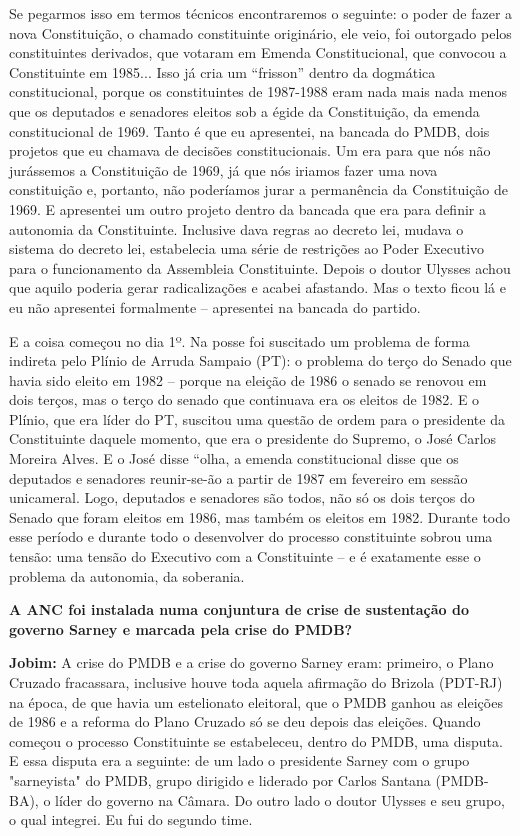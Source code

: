 Se pegarmos isso em termos técnicos encontraremos o seguinte: o poder de
fazer a nova Constituição, o chamado constituinte originário, ele veio,
foi outorgado pelos constituintes derivados, que votaram em Emenda
Constitucional, que convocou a Constituinte em 1985... Isso já cria um
``frisson'' dentro da dogmática constitucional, porque os constituintes
de 1987-1988 eram nada mais nada menos que os deputados e senadores
eleitos sob a égide da Constituição, da emenda constitucional de 1969.
Tanto é que eu apresentei, na bancada do PMDB, dois projetos que eu
chamava de decisões constitucionais. Um era para que nós não jurássemos
a Constituição de 1969, já que nós iriamos fazer uma nova constituição
e, portanto, não poderíamos jurar a permanência da Constituição de 1969.
E apresentei um outro projeto dentro da bancada que era para definir a
autonomia da Constituinte. Inclusive dava regras ao decreto lei, mudava
o sistema do decreto lei, estabelecia uma série de restrições ao Poder
Executivo para o funcionamento da Assembleia Constituinte. Depois o
doutor Ulysses achou que aquilo poderia gerar radicalizações e acabei
afastando. Mas o texto ficou lá e eu não apresentei formalmente --
apresentei na bancada do partido.

E a coisa começou no dia 1º. Na posse foi suscitado um problema de forma
indireta pelo Plínio de Arruda Sampaio (PT): o problema do terço do
Senado que havia sido eleito em 1982 -- porque na eleição de 1986 o
senado se renovou em dois terços, mas o terço do senado que continuava
era os eleitos de 1982. E o Plínio, que era líder do PT, suscitou uma
questão de ordem para o presidente da Constituinte daquele momento, que
era o presidente do Supremo, o José Carlos Moreira Alves. E o José disse
``olha, a emenda constitucional disse que os deputados e senadores
reunir-se-ão a partir de 1987 em fevereiro em sessão unicameral. Logo,
deputados e senadores são todos, não só os dois terços do Senado que
foram eleitos em 1986, mas também os eleitos em 1982. Durante todo esse
período e durante todo o desenvolver do processo constituinte sobrou uma
tensão: uma tensão do Executivo com a Constituinte -- e é exatamente
esse o problema da autonomia, da soberania.

\textbf{A ANC foi instalada numa conjuntura de crise de sustentação do
governo Sarney e marcada pela crise do PMDB?}

\textbf{Jobim:} A crise do PMDB e a crise do governo Sarney eram:
primeiro, o Plano Cruzado fracassara, inclusive houve toda aquela
afirmação do Brizola (PDT-RJ) na época, de que havia um estelionato
eleitoral, que o PMDB ganhou as eleições de 1986 e a reforma do Plano
Cruzado só se deu depois das eleições. Quando começou o processo
Constituinte se estabeleceu, dentro do PMDB, uma disputa. E essa disputa
era a seguinte: de um lado o presidente Sarney com o grupo "sarneyista"
do PMDB, grupo dirigido e liderado por Carlos Santana (PMDB-BA), o líder
do governo na Câmara. Do outro lado o doutor Ulysses e seu grupo, o qual
integrei. Eu fui do segundo time.

